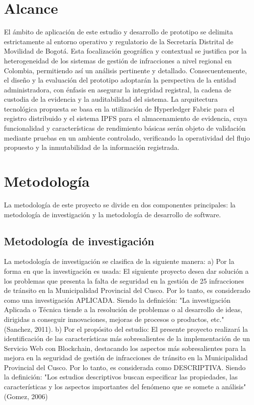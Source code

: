\section{Alcance}
 El ámbito de aplicación de este estudio y desarrollo de prototipo se delimita estrictamente al entorno operativo y regulatorio de la Secretaría Distrital de Movilidad de Bogotá. Esta focalización geográfica y contextual se justifica por la heterogeneidad de los sistemas de gestión de infracciones a nivel regional en Colombia, permitiendo así un análisis pertinente y detallado. Consecuentemente, el diseño y la evaluación del prototipo adoptarán la perspectiva de la entidad administradora, con énfasis en asegurar la integridad registral, la cadena de custodia de la evidencia y la auditabilidad del sistema. La arquitectura tecnológica propuesta se basa en la utilización de Hyperledger Fabric para el registro distribuido y el sistema IPFS para el almacenamiento de evidencia, cuya funcionalidad y características de rendimiento básicas serán objeto de validación mediante pruebas en un ambiente controlado, verificando la operatividad del flujo propuesto y la inmutabilidad de la información registrada. 

  \section{Metodología }
  La metodología de este proyecto se divide en dos componentes principales: la metodología de investigación y la metodología de desarrollo de software.  

    \subsection{Metodología de investigación }
 La metodología de investigación se clasifica de la siguiente manera: a) Por la forma en que la investigación es usada: El siguiente proyecto desea dar solución a los problemas que presenta la falta de seguridad en la gestión de 25 infracciones de tránsito en la Municipalidad Provincial del Cusco. Por lo tanto, es considerado como una investigación APLICADA. Siendo la definición: "La investigación Aplicada o Técnica tiende a la resolución de problemas o al desarrollo de ideas, dirigidas a conseguir innovaciones, mejoras de procesos o productos, etc." (Sanchez, 2011). b) Por el propósito del estudio: El presente proyecto realizará la identificación de las características más sobresalientes de la implementación de un Servicio Web con Blockchain, destacando los aspectos más sobresalientes para la mejora en la seguridad de gestión de infracciones de tránsito en la Municipalidad Provincial del Cusco. Por lo tanto, es considerada como DESCRIPTIVA. Siendo la definición: "Los estudios descriptivos buscan especificar las propiedades, las características y los aspectos importantes del fenómeno que se somete a análisis" (Gomez, 2006) 

